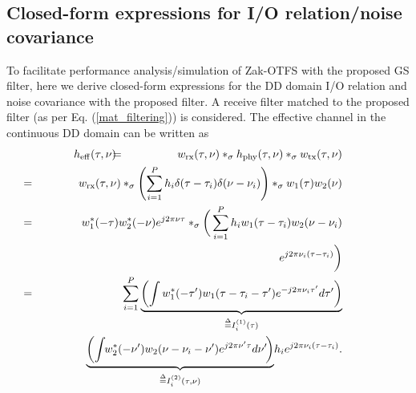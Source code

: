\vspace{-2mm}
\subsection{Closed-form expressions for I/O relation/noise covariance} 
To facilitate performance analysis/simulation of Zak-OTFS with the proposed GS filter, here we derive closed-form expressions for the DD domain I/O relation and noise covariance with the proposed filter. A receive filter matched to the proposed filter (as per Eq. (\ref{mat_filtering})) is considered. The effective channel in the continuous DD domain 
can be written as 
\begin{eqnarray}
h_{\mathrm{eff}}(\tau,\nu) & \hspace{-2mm} = & \hspace{-2mm} w_{\mathrm{rx}}(\tau,\nu)*_{\sigma}h_{\mathrm{phy}}(\tau,\nu)*_{\sigma}w_{\mathrm{tx}}(\tau,\nu) \nonumber \\ 
& \hspace{-30mm} = & \hspace{-17mm} w_{\mathrm{rx}}(\tau,\nu)*_{\sigma}\left(\sum_{i=1}^{P}h_{i}\delta(\tau-\tau_{i})\delta(\nu-\nu_{i})\right)*_{\sigma}w_{1}(\tau)w_{2}(\nu) \nonumber    \\ 
& \hspace{-30mm} = & \hspace{-17mm} w_{1}^{*}(-\tau)w_{2}^{*}(-\nu)e^{j2\pi\nu\tau}*_{\sigma}\bigg(\sum_{i=1}^{P}h_{i}w_{1}(\tau-\tau_{i})w_{2}(\nu-\nu_{i}) \nonumber \\ 
& \hspace{-30mm} & \hspace{-17mm} e^{j2\pi\nu_{i}(\tau-\tau_{i})}\bigg) \nonumber \\
& \hspace{-30mm} = & \hspace{-17mm} \sum_{i=1}^{P}
\underbrace{\left(\int w_{1}^{*}(-\tau')w_{1}(\tau-\tau_{i}-\tau') e^{-j2\pi\nu_{i}\tau'}d\tau'\right)}_{\overset{\Delta}{=}I_{i}^{(1)}(\tau)} \nonumber \\
& \hspace{-35mm} & \hspace{-20mm} 
\underbrace{\left(\int \hspace{-1mm} w_{2}^{*}(-\nu')w_{2}(\nu-\nu_{i}-\nu')e^{j2\pi\nu'\tau}d\nu'\hspace{-0.5mm} \right)}_{\overset{\Delta}{=}I_{i}^{(2)}(\tau,\nu)}
\hspace{-0.5mm} h_{i}e^{j2\pi\nu_{i}(\tau-\tau_{i})}.
\label{eqn:channel_matched}
\end{eqnarray}
